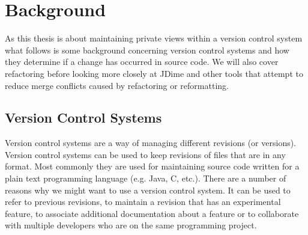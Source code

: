 \chapter{Background}

As this thesis is about maintaining private views within a version control system what follows is some background concerning version control systems and how they determine if a change has occurred in source code.  We will also cover refactoring before looking more closely at JDime and other tools that attempt to reduce merge conflicts caused by refactoring or reformatting.  

\section{Version Control Systems}
Version control systems are a way of managing different revisions (or versions). Version control systems can be used to keep revisions of files that are in any format. Most commonly they are used for maintaining source code written for a plain text programming language (e.g. Java, C, etc.). There are a number of reasons why we might want to use a version control system. It can be used to refer to previous revisions, to maintain a revision that has an experimental feature, to associate additional documentation about a feature or to collaborate with multiple developers who are on the same programming project.


